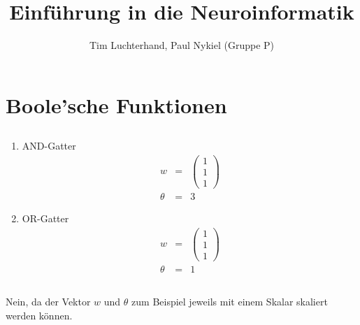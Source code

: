 \documentclass[DIN, pagenumber=false, fontsize=11pt, parskip=half]{scrartcl}
\title{Einführung in die Neuroinformatik}
\author{Tim Luchterhand, Paul Nykiel (Gruppe P)}
\begin{document}
    \maketitle
    \section{Boole'sche Funktionen}
    \subsection{}
    \begin{enumerate}[label = (\alph*)]
        \item AND-Gatter
            \begin{eqnarray*}
                w &=& \begin{pmatrix}
                    1 \\ 1 \\ 1
                \end{pmatrix} \\
                \theta &=& 3
            \end{eqnarray*}
        \item OR-Gatter
            \begin{eqnarray*}
                w &=& \begin{pmatrix}
                    1 \\ 1 \\ 1
                \end{pmatrix} \\
                \theta &=& 1
            \end{eqnarray*}
    \end{enumerate}
    \subsection{}
    Nein, da der Vektor $w$ und $\theta$ zum Beispiel jeweils mit einem Skalar skaliert werden können.
\end{document}
